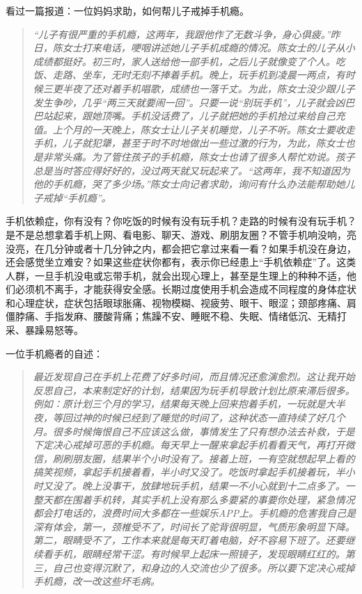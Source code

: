 看过一篇报道：一位妈妈求助，如何帮儿子戒掉手机瘾。

\begin{quote}\it
    “儿子有很严重的手机瘾，这两年，我跟他作了无数斗争，身心俱疲。”昨日，陈女士打来电话，哽咽讲述她儿子手机成瘾的情况。陈女士的儿子从小成绩都挺好。初三时，家人送给他一部手机，之后儿子就像变了个人。吃饭、走路、坐车，无时无刻不捧着手机。晚上，玩手机到凌晨一两点，有时候三更半夜了还对着手机唱歌，成绩也一落千丈。为此，陈女士没少跟儿子发生争吵，几乎“两三天就要闹一回”。只要一说“别玩手机”，儿子就会凶巴巴站起来，跟她顶嘴。手机没话费了，儿子就把她的手机抢过来给自己充值。上个月的一天晚上，陈女士让儿子关机睡觉，儿子不听。陈女士要收走手机，儿子就犯犟，甚至于时不时地做出一些过激的行为，为此，陈女士也是非常头痛。为了管住孩子的手机瘾，陈女士也请了很多人帮忙劝说。孩子总是当时答应得好好的，没过两天就又玩起来了。“这两年，我不知道因为他的手机瘾，哭了多少场。”陈女士向记者求助，询问有什么办法能帮助她儿子戒掉“手机瘾”。
\end{quote}

手机依赖症，你有没有？你吃饭的时候有没有玩手机？走路的时候有没有玩手机？是不是总想拿着手机上网、看电影、聊天、游戏、刷朋友圈？不管手机响没响，亮没亮，在几分钟或者十几分钟之内，都会把它拿过来看一看？如果手机没在身边，还会感觉坐立难安？如果这些症状你都有，表示你已经患上“手机依赖症”了。这类人群，一旦手机没电或忘带手机，就会出现心理上，甚至是生理上的种种不适，他们必须机不离手，才能获得安全感。长期过度使用手机会造成不同程度的身体症状和心理症状，症状包括眼球胀痛、视物模糊、视疲劳、眼干、眼涩；颈部疼痛、肩僵脖痛、手指发麻、腰酸背痛；焦躁不安、睡眠不稳、失眠、情绪低沉、无精打采、暴躁易怒等。

一位手机瘾者的自述：

\begin{quote}\it
    最近发现自己在手机上花费了好多时间，而且情况还愈演愈烈。这让我开始反思自己，本来制定好的计划，结果因为玩手机导致计划比原来滞后很多。例如：原计划三个月的学习，结果每天晚上回来抱着手机，一玩就是大半夜，等回过神的时候已经到了睡觉的时间了，这种状态一直持续了好几个月。很多时候悔恨自己不应该这么做，事情发生了只有想办法去补救，于是下定决心戒掉可恶的手机瘾。每天早上一醒来拿起手机看看天气，再打开微信，刷刷朋友圈，结果半个小时没有了。接着上班，一有空就想起早上看的搞笑视频，拿起手机接着看，半小时又没了。吃饭时拿起手机接着玩，半小时又没了。晚上没事干，放肆地玩手机，结果一不小心就到十二点多了。一整天都在围着手机转，其实手机上没有那么多要紧的事要你处理，紧急情况都会打电话的，浪费时间大多都在一些娱乐APP上。手机瘾的危害我自己是深有体会，第一，颈椎受不了，时间长了驼背很明显，气质形象明显下降。第二，眼睛受不了，工作本来就是每天盯着电脑，好不容易下班了。还要继续看手机，眼睛经常干涩。有时候早上起床一照镜子，发现眼睛红红的。第三，自己也变得沉默了，和身边的人交流也少了很多。所以要下定决心戒掉手机瘾，改一改这些坏毛病。
\end{quote}

